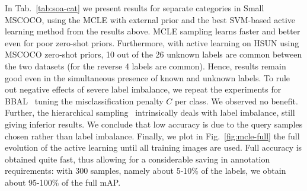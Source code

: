 \documentclass[10pt,twocolumn,letterpaper]{article}
\begin{document}
In Tab.~\ref{tab:soa-cat} we present results for separate categories in Small MSCOCO, using the MCLE with external prior and the best SVM-based active learning method from the results above.  MCLE sampling learns faster and better even for poor zero-shot priors.
Furthermore, with active learning on HSUN using MSCOCO zero-shot priors, 10 out of the 26 unknown labels are common between the two datasets (for the reverse 4 labels are common). Hence, results remain good even in the simultaneous presence of known and unknown labels. To rule out negative effects of severe label imbalance, we repeat the experiments for BBAL~\cite{VijayanarasimhanJG10} tuning the misclassification penalty $C$ per class. We observed no benefit. Further, the hierarchical sampling~\cite{Dasgupta} intrinsically deals with label imbalance, still giving inferior results. We conclude that low accuracy is due to the query samples chosen rather than label imbalance.
Finally, we plot in Fig.~\ref{fig:mcle-full} the full evolution of the active learning until all training images are used. Full accuracy is obtained quite fast, thus allowing for a considerable saving in annotation requirements: with 300 samples, namely about 5-10\% of the labels, we obtain about 95-100\% of the full mAP. 
\end{document}
